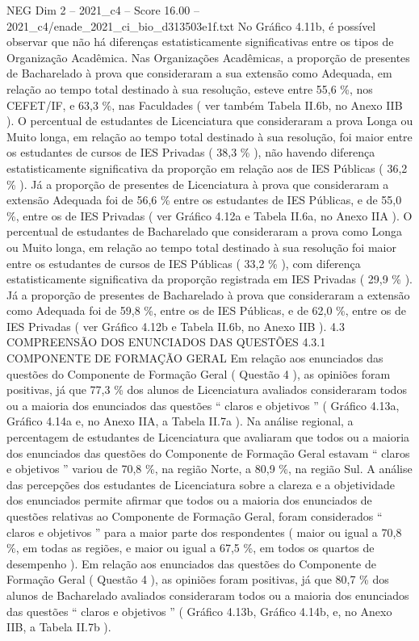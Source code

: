 \begin{textsample}{NEG Dim 2 – 2021\_c4 – Score 16.00 – 2021\_c4/enade\_2021\_ci\_bio\_d313503e1f.txt}
No Gráfico 4.11b, é possível observar que não há diferenças estatisticamente significativas entre os tipos de Organização Acadêmica.
Nas Organizações Acadêmicas, a proporção de presentes de Bacharelado à prova que consideraram a sua extensão como Adequada, em relação ao tempo total destinado à sua resolução, esteve entre 55,6 \%, nos CEFET/IF, e 63,3 \%, nas Faculdades ( ver também Tabela II.6b, no Anexo IIB ).
O percentual de estudantes de Licenciatura que consideraram a prova Longa ou Muito longa, em relação ao tempo total destinado à sua resolução, foi maior entre os estudantes de cursos de IES Privadas ( 38,3 \% ), não havendo diferença estatisticamente significativa da proporção em relação aos de IES Públicas ( 36,2 \% ).
Já a proporção de presentes de Licenciatura à prova que consideraram a extensão Adequada foi de 56,6 \% entre os estudantes de IES Públicas, e de 55,0 \%, entre os de IES Privadas ( ver Gráfico 4.12a e Tabela II.6a, no Anexo IIA ).
O percentual de estudantes de Bacharelado que consideraram a prova como Longa ou Muito longa, em relação ao tempo total destinado à sua resolução foi maior entre os estudantes de cursos de IES Públicas ( 33,2 \% ), com diferença estatisticamente significativa da proporção registrada em IES Privadas ( 29,9 \% ).
Já a proporção de presentes de Bacharelado à prova que consideraram a extensão como Adequada foi de 59,8 \%, entre os de IES Públicas, e de 62,0 \%, entre os de IES Privadas ( ver Gráfico 4.12b e Tabela II.6b, no Anexo IIB ). 4.3 COMPREENSÃO DOS ENUNCIADOS DAS QUESTÕES 4.3.1 COMPONENTE DE FORMAÇÃO GERAL Em relação aos enunciados das questões do Componente de Formação Geral ( Questão 4 ), as opiniões foram positivas, já que 77,3 \% dos alunos de Licenciatura avaliados consideraram todos ou a maioria dos enunciados das questões “ claros e objetivos ” ( Gráfico 4.13a, Gráfico 4.14a e, no Anexo IIA, a Tabela II.7a ).
Na análise regional, a percentagem de estudantes de Licenciatura que avaliaram que todos ou a maioria dos enunciados das questões do Componente de Formação Geral estavam “ claros e objetivos ” variou de 70,8 \%, na região Norte, a 80,9 \%, na região Sul.
A análise das percepções dos estudantes de Licenciatura sobre a clareza e a objetividade dos enunciados permite afirmar que todos ou a maioria dos enunciados de questões relativas ao Componente de Formação Geral, foram considerados “ claros e objetivos ” para a maior parte dos respondentes ( maior ou igual a 70,8 \%, em todas as regiões, e maior ou igual a 67,5 \%, em todos os quartos de desempenho ).
Em relação aos enunciados das questões do Componente de Formação Geral ( Questão 4 ), as opiniões foram positivas, já que 80,7 \% dos alunos de Bacharelado avaliados consideraram todos ou a maioria dos enunciados das questões “ claros e objetivos ” ( Gráfico 4.13b, Gráfico 4.14b, e, no Anexo IIB, a Tabela II.7b ).

\end{textsample}
